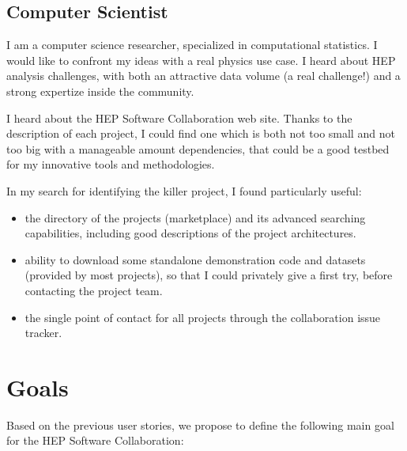 \documentclass[11pt]{article} %
\begin{document}
\subsection{Computer Scientist}

I am a computer science researcher, specialized in computational statistics. I would like to confront my ideas with a real physics use case. I heard about HEP 
analysis challenges, with both an attractive data volume (a real challenge!) and a strong expertize inside the community.

I heard about the HEP Software Collaboration web site. Thanks to the description of each project, I could find one 
which is both not too small and not too big with a manageable amount dependencies, that could be a good testbed for my innovative tools and methodologies.

In my search for identifying the killer project, I found particularly useful:
\begin{itemize}
\item the directory of the projects (marketplace) and its advanced searching capabilities, including good descriptions of the project architectures.
\item ability to download some standalone demonstration code and datasets (provided by most projects), so that I could privately give a first try, before contacting the project team.
\item the single point of contact for all projects through the collaboration issue tracker.
\end{itemize}



\section{Goals}

Based on the previous user stories, we propose to define the following main goal for the HEP Software
Collaboration:
\end{document}
